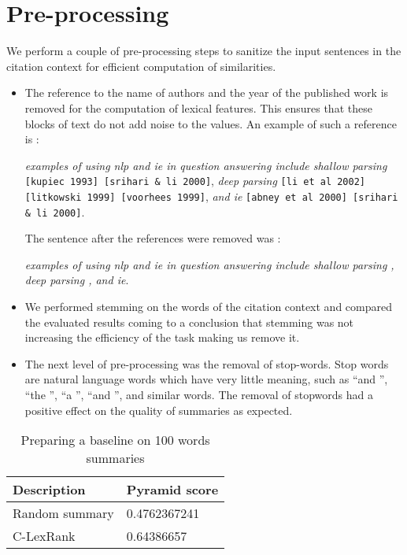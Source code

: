 \section{Pre-processing}
We perform a couple of pre-processing steps to sanitize the input sentences in the citation context for efficient computation of similarities. 
\begin{itemize}
\item The reference to the name of authors and the year of the published work is removed for the computation of lexical features. This ensures that these blocks of text do not add noise to the values. An example of such a reference is :

\textit{examples of using nlp and ie in question answering include shallow parsing} \texttt{[kupiec 1993] [srihari \& li 2000]},\textit{ deep parsing}  \texttt{[li et al 2002] [litkowski 1999] [voorhees 1999]}, \textit{and ie} \texttt{[abney et al 2000] [srihari \& li 2000]}. 

The sentence after the references were removed was :

\textit{examples of using nlp and ie in question answering include shallow parsing , deep parsing , and ie}. 

\item We performed stemming on the words of the citation context and compared the evaluated results coming to a conclusion that stemming was not increasing the efficiency of the task making us remove it.

\item The next level of pre-processing was the removal of stop-words. Stop words are natural language words which have very little meaning, such as \textquotedblleft and \textquotedblright, \textquotedblleft the \textquotedblright, \textquotedblleft a \textquotedblright, \textquotedblleft and \textquotedblright, and similar words. The removal of stopwords had a positive effect on the quality of summaries as expected.

\end{itemize}

\begin{table}[]
\centering
\label{my-label}
\begin{tabular}{l|l}
\hline
\textbf{Description} & \textbf{Pyramid score} \\ \hline
Random summary       & 0.4762367241         \\ \hline
C-LexRank            & 0.64386657           \\ \hline
\end{tabular}
\caption{Preparing a baseline on 100 words summaries}

\end{table}


